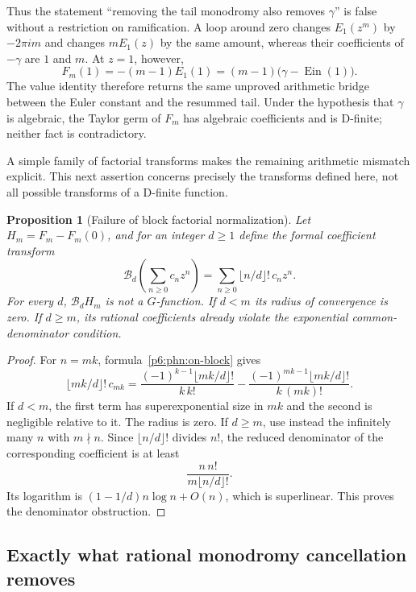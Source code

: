 \documentclass[11pt,a4paper]{article}
\newtheorem{proposition}[theorem]{Proposition}
\theoremstyle{definition}
\theoremstyle{remark}
\numberwithin{equation}{section}
\begin{document}
Thus the statement ``removing the tail monodromy also removes
$\gamma$'' is false without a restriction on ramification.  A loop
around zero changes $E_1(z^m)$ by $-2\pi i m$ and changes $mE_1(z)$
by the same amount, whereas their coefficients of $-\gamma$ are
$1$ and $m$.  At $z=1$, however,
\[
 F_m(1)=-(m-1)E_1(1)
       =(m-1)\bigl(\gamma-\operatorname{Ein}(1)\bigr).
\]
The value identity therefore returns the same unproved arithmetic
bridge between the Euler constant and the resummed tail.  Under the
hypothesis that $\gamma$ is algebraic, the Taylor germ of $F_m$ has
algebraic coefficients and is D-finite; neither fact is contradictory.

A simple family of factorial transforms makes the remaining
arithmetic mismatch explicit.  This next assertion concerns precisely
the transforms defined here, not all possible transforms of a
D-finite function.

\begin{proposition}[Failure of block factorial normalization]
\label{p6:phn:block-borel}
Let $H_m=F_m-F_m(0)$, and for an integer $d\geq1$ define the formal
coefficient transform
\[
 \mathcal B_d\left(\sum_{n\geq0}c_nz^n\right)
       =\sum_{n\geq0}\lfloor n/d\rfloor!\,c_nz^n.
\]
For every $d$, $\mathcal B_dH_m$ is not a $G$-function.  If $d<m$
its radius of convergence is zero.  If $d\geq m$, its rational
coefficients already violate the exponential common-denominator
condition.
\end{proposition}
\begin{proof}
For $n=mk$, formula~\eqref{p6:phn:on-block} gives
\[
 \lfloor mk/d\rfloor!\,c_{mk}
  =\frac{(-1)^{k-1}\lfloor mk/d\rfloor!}{k\,k!}
     -\frac{(-1)^{mk-1}\lfloor mk/d\rfloor!}{k\,(mk)!}.
\]
If $d<m$, the first term has superexponential size in $mk$ and the
second is negligible relative to it.  The radius is zero.
If $d\geq m$, use instead the infinitely many $n$ with $m\nmid n$.
Since $\lfloor n/d\rfloor!$ divides $n!$, the reduced denominator
of the corresponding coefficient is at least
\[
 \frac{n\,n!}{m\lfloor n/d\rfloor!}.
\]
Its logarithm is $(1-1/d)n\log n+O(n)$, which is superlinear.
This proves the denominator obstruction.
\end{proof}

\subsection{Exactly what rational monodromy cancellation removes}
\end{document}

